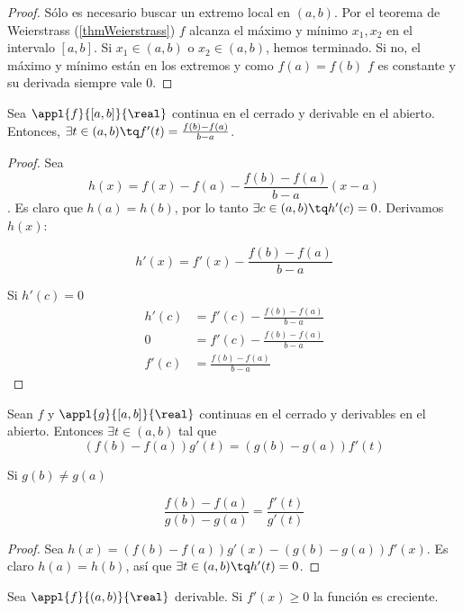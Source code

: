 \documentclass[palatino, nochap]{apuntes}
\begin{document}
\begin{proof}
Sólo es necesario buscar un extremo local en $(a,b)$. Por el teorema de Weierstrass (\ref{thmWeierstrass}) $f$ alcanza el máximo y mínimo $x_1, x_2$ en el intervalo $[a,b]$. Si $x_1\in (a,b)$ o $x_2 \in (a,b)$, hemos terminado. Si no, el máximo y mínimo están en los extremos y como $f(a)=f(b)$ $f$ es constante y su derivada siempre vale 0.
\end{proof}

\begin{theorem}
Sea $\appl{f}{[a,b]}{\real}$ continua en el cerrado y derivable en el abierto. Entonces, $\exists t \in (a,b) \tq f'(t)=\frac{f(b)-f(a)}{b-a}$.
\end{theorem}

\begin{proof}
Sea \[h(x)=f(x) - f(a)-\frac{f(b)-f(a)}{b-a}(x-a)\]. Es claro que $h(a)=h(b)$, por lo tanto $\exists c \in (a,b) \tq h'(c)=0$. Derivamos $h(x)$:

\[ h'(x)=f'(x) - \frac{f(b)-f(a)}{b-a} \]

Si $h'(c)=0$
\begin{align*}
h'(c)&=f'(c)-\frac{f(b)-f(a)}{b-a} \\
0 &= f'(c)-\frac{f(b)-f(a)}{b-a} \\
f'(c)&=\frac{f(b)-f(a)}{b-a}
\end{align*}
\end{proof}

\begin{theorem}
Sean $f$ y $\appl{g}{[a,b]}{\real}$ continuas en el cerrado y derivables en el abierto. Entonces $\exists t \in (a,b)$ tal que
\[ \left(f(b)-f(a)\right)g'(t)=\left(g(b)-g(a)\right)f'(t) \]

Si $g(b)\neq g(a)$

\[ \frac{f(b)-f(a)}{g(b)-g(a)}=\frac{f'(t)}{g'(t)} \]

\end{theorem}

\begin{proof}
Sea $h(x)=\left(f(b)-f(a)\right)g'(x)-\left(g(b)-g(a)\right)f'(x)$. Es claro $h(a)=h(b)$, así que $\exists t \in (a,b) \tq h'(t)=0$.
\end{proof}

\begin{lemma}
Sea $\appl{f}{(a,b)}{\real}$ derivable. Si $f'(x)\geq 0$ la función es creciente.
\end{lemma}
\end{document}
